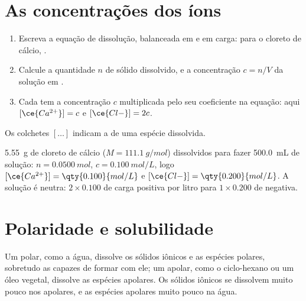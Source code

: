 \section{As concentrações dos íons}

\begin{method}\label{met:g11:dissolution:ions}
\begin{enumerate}
  \item Escreva a equação de dissolução, balanceada em  e em
        carga: para o cloreto de cálcio,
        .
  \item Calcule a quantidade $n$ de sólido dissolvido, e a concentração
        $c = n / V$ da solução em .
  \item Cada  tem a concentração $c$ multiplicada pelo seu coeficiente
        na equação: aqui $[\ce{Ca^{2+}}] = c$ e
        $[\ce{Cl-}] = 2c$.
\end{enumerate}
Os colchetes $[\ldots]$ indicam a  de uma espécie
dissolvida.
\end{method}

\begin{example}\label{ex:g11:dissolution:cacl2}
\qty{5.55}{g} de cloreto de cálcio ($M = \qty{111.1}{g/mol}$) dissolvidos
para fazer \qty{500.0}{mL} de solução: $n = \qty{0.0500}{mol}$,
$c = \qty{0.100}{mol/L}$, logo $[\ce{Ca^{2+}}] = \qty{0.100}{mol/L}$ e
$[\ce{Cl-}] = \qty{0.200}{mol/L}$. A solução é neutra: $2 \times
0.100$ de carga positiva por litro para $1 \times 0.200$ de negativa.
\end{example}

\section{Polaridade e solubilidade}

\begin{proposition}\label{prop:g11:dissolution:like}
Um  polar, como a água, dissolve os sólidos iônicos e as
espécies polares, sobretudo as capazes de formar 
com ele; um  apolar, como o ciclo-hexano ou um óleo vegetal,
dissolve as espécies apolares. Os sólidos iônicos se dissolvem muito
pouco nos  apolares, e as espécies apolares muito pouco na
água.
\end{proposition}

